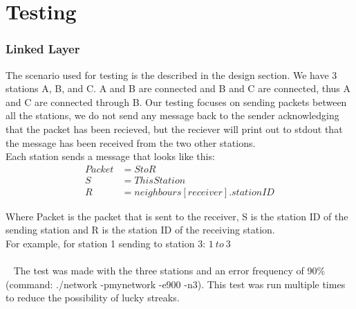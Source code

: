 \section{Testing}


\subsubsection{Linked Layer}
The scenario used for testing is the described in the design section.
We have 3 stations A, B, and C. A and B are connected and B and C are connected, thus A and C are connected through B. Our testing focuses on sending packets between all the stations, we do not send any message back to the sender acknowledging that the packet has been recieved, but the reciever will print out to stdout that the message has been received from the two other stations.\\

Each station sends a message that looks like this:
\begin{align*}
Packet &= S to R\\
S &= ThisStation\\
R &= neighbours[receiver].stationID
\end{align*}

Where Packet is the packet that is sent to the receiver, S is the station ID of the sending station and R is the station ID of the receiving station.\\
For example, for station 1 sending to station 3: $1\ to\ 3$\\
\\~
The test was made with the three stations and an error frequency of 90\% (command: ./network -pmynetwork -e900 -n3). This test was run multiple times to reduce the possibility of lucky streaks.

